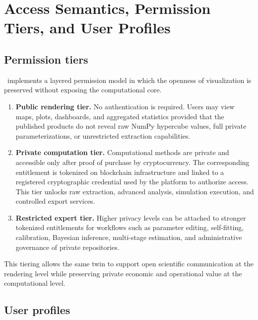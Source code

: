 



\section{Access Semantics, Permission Tiers, and User Profiles}

\subsection{Permission tiers}

\hydrot\ implements a layered permission model in which the openness of visualization is preserved without exposing the computational core.

\begin{enumerate}
\item \textbf{Public rendering tier.} No authentication is required. Users may view maps, plots, dashboards, and aggregated statistics provided that the published products do not reveal raw NumPy hypercube values, full private parameterizations, or unrestricted extraction capabilities.

\item \textbf{Private computation tier.} Computational methods are private and accessible only after proof of purchase by cryptocurrency. The corresponding entitlement is tokenized on blockchain infrastructure and linked to a registered cryptographic credential used by the platform to authorize access. This tier unlocks raw extraction, advanced analysis, simulation execution, and controlled export services.

\item \textbf{Restricted expert tier.} Higher privacy levels can be attached to stronger tokenized entitlements for workflows such as parameter editing, self-fitting, calibration, Bayesian inference, multi-stage estimation, and administrative governance of private repositories.
\end{enumerate}

This tiering allows the same twin to support open scientific communication at the rendering level while preserving private economic and operational value at the computational level.

\subsection{User profiles}

